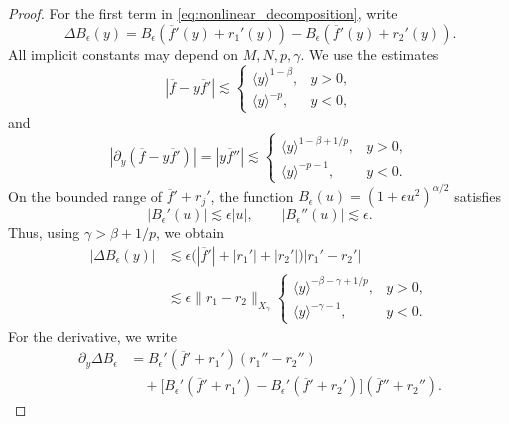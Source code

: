 \documentclass[11pt]{amsart}
\theoremstyle{definition}
\theoremstyle{remark}
\numberwithin{equation}{section}
\newcommand{\ov}[1]{\overline{#1}}
\newcommand{\ang}[1]{\langle #1 \rangle}
\begin{document}
\begin{proof}
    For the first term in \eqref{eq:nonlinear_decomposition}, write
    \begin{equation}\label{eq:N1_delta_B}
        \Delta B_\epsilon(y)
        =B_\epsilon(\ov{f}'(y)+r_1'(y))-B_\epsilon(\ov{f}'(y)+r_2'(y)).
    \end{equation}
    All implicit constants may depend on $M,N,p,\gamma$.
    We use the estimates
    \begin{equation}\label{eq:N1_profile_factor}\left|\ov{f} - y\ov{f}'\right| \lesssim \begin{cases}
        \ang{y}^{1-\beta}, & y > 0,\\
        \ang{y}^{-p}, & y < 0,
    \end{cases}\end{equation}
    and
    \begin{equation}\label{eq:N1_profile_factor_derivative}|\partial_y(\ov{f} - y\ov{f}')| = |y\ov{f}''| \lesssim \begin{cases}
        \ang{y}^{1-\beta+1/p}, & y > 0,\\
        \ang{y}^{-p-1}, & y < 0.
    \end{cases}\end{equation}
    On the bounded range of $\ov{f}'+r_j'$, the function
    $B_\epsilon(u)=(1+\epsilon u^2)^{\alpha/2}$ satisfies
    \[
        |B_\epsilon'(u)|\lesssim\epsilon|u|,\qquad
        |B_\epsilon''(u)|\lesssim\epsilon.
    \]
    Thus, using $\gamma>\beta+1/p$, we obtain
    \begin{equation}\label{eq:N1_delta_B_bound}
\begin{aligned}
        |\Delta B_\epsilon(y)|
        &\lesssim\epsilon\bigl(|\ov{f}'|+|r_1'|+|r_2'|\bigr)|r_1'-r_2'|\\
        &\lesssim\epsilon\|r_1-r_2\|_{X_\gamma}
        \begin{cases}
            \ang{y}^{-\beta-\gamma+1/p}, & y>0,\\
            \ang{y}^{-\gamma-1}, & y<0.
        \end{cases}
    \end{aligned}
\end{equation}
    For the derivative, we write
    \begin{align*}
        \partial_y\Delta B_\epsilon
        &=B_\epsilon'(\ov{f}'+r_1')(r_1'' - r_2'')\\
        &\quad+\bigl[B_\epsilon'(\ov{f}'+r_1')
        -B_\epsilon'(\ov{f}'+r_2')\bigr](\ov{f}''+r_2'').
    \end{align*}

\end{proof}
\end{document}
